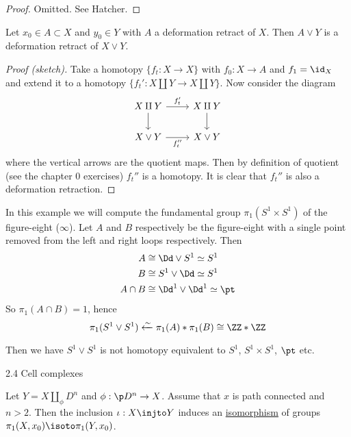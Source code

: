 \begin{proof}
	Omitted.
	See Hatcher.
\end{proof}

\begin{prop}
	Let $x_0 \in A \subset X$ and $y_0 \in Y$ with $A$ a deformation retract of $X$.
	Then $A \vee Y$ is a deformation retract of $X \vee Y$.
\end{prop}

\begin{proof}[Proof (sketch)]
	Take a homotopy $\{f_t: X \to X\}$ with $f_0: X \to A$ and $f_1 = \id_X$ and extend it to a homotopy $\{f_t': X \amalg Y \to X \amalg Y\}$.
	Now consider the diagram
	\[
	\begin{tikzcd}
		X \amalg Y \ar[r, "f_t'"] \ar[d] & X \amalg Y \ar[d] \\
		X \vee Y \ar[r, swap, "f_t''"] & X \vee Y
	\end{tikzcd}
	\]
	where the vertical arrows are the quotient maps.
	Then by definition of quotient (see the chapter 0 exercises) $f_t''$ is a homotopy.
	It is clear that $f_t''$ is also a deformation retraction.
\end{proof}

\begin{exam}
	In this example we will compute the fundamental group $\pi_1(S^1 \times S^1)$ of the figure-eight ($\infty$).
	Let $A$ and $B$ respectively be the figure-eight with a single point removed from the left and right loops respectively.
	Then
	\begin{align*}
		A &\cong \Dd \vee S^1 \simeq S^1 \\
		B &\cong S^1 \vee \Dd \simeq S^1 \\
		A \cap B &\cong \Dd^1 \vee \Dd^1 \simeq \pt
	\end{align*}
	So $\pi_1(A \cap B) = 1$, hence
	\[\pi_1(S^1 \vee S^1) \xleftarrow{\sim} \pi_1(A) * \pi_1(B) \cong \ZZ * \ZZ\]
	
	Then we have $S^1 \vee S^1$ is not homotopy equivalent to $S^1$, $S^1 \times S^1$, $\pt$ etc.
\end{exam}

2.4 Cell complexes

\begin{prop}
	Let $Y = X \amalg_\phi D^n$ and $\phi: \p D^n \to X$.
	Assume that $x$ is path connected and $n>2$.
	Then the inclusion $\iota: X \injto Y$ induces an \underline{isomorphism} of groups $\pi_1(X,x_0) \isoto \pi_1(Y,x_0)$.
\end{prop}

